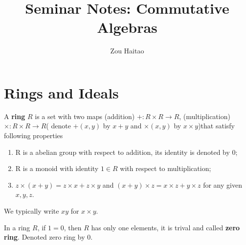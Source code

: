 \documentclass{amsart}
\title{Seminar Notes: Commutative Algebras}
\author{Zou Haitao}
\begin{document}
\maketitle
\tableofcontents
\section{Rings and Ideals}
\begin{secdefn}
A \textbf{ring} $R$ is a set with two maps (addition) $+ : R \times R \rightarrow R$, (multiplication)$\times : R \times R \rightarrow R$( denote $+(x,y)$ by $x+y$ and $\times (x,y)$ by $x \times y$)that satisfy following properties
\begin{enumerate}
\item R is a abelian group with respect to addition, its identity is denoted by $0$;
\item R is a monoid with identity $1 \in R$ with respect to multiplication;
\item $z \times (x+y)= z \times x + z \times y$ and $(x+y) \times z = x \times z + y \times z$ for any given $x,y,z$.
\end{enumerate}
We typically write $xy$ for $x \times y$.
\end{secdefn}
In a ring $R$, if $1=0$, then $R$ has only one elements, it is trival and called \textbf{zero ring}. Denoted zero ring by 0.
\end{document}
